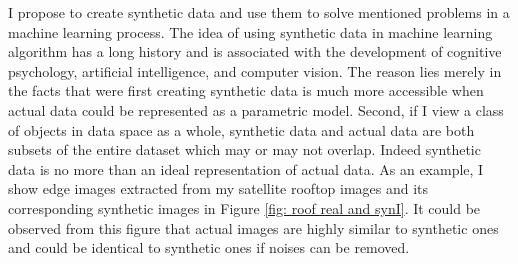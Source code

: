 \documentclass{iitthesis}
\begin{document}
I propose to create synthetic data and use them to solve mentioned problems in a machine learning process. The idea of using synthetic data in machine learning algorithm has a long history and is associated with the development of cognitive psychology, artificial intelligence, and computer vision. The reason lies merely in the facts that were first creating synthetic data is much more accessible when actual data could be represented as a parametric model. Second, if I view a class of objects in data space as a whole, synthetic data and actual data are both subsets of the entire dataset which may or may not overlap. Indeed synthetic data is no more than an ideal representation of actual data. As an example, I show edge images extracted from my satellite rooftop images and its corresponding synthetic images in Figure \ref{fig: roof real and synI}. It could be observed from this figure that actual images are highly similar to synthetic ones and could be identical to synthetic ones if noises can be removed.

 \label{dataspace: relatedwork}
\end{document}
